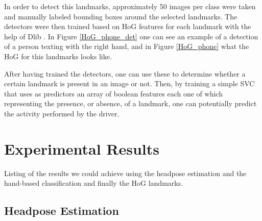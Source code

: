 \documentclass[10pt,twocolumn,letterpaper]{article}
\begin{document}
In order to detect this landmarks, approximately 50 images per class were taken and manually labeled bounding boxes around the selected landmarks. The detectors were then trained based on HoG features for each landmark with the help of Dlib \cite{dlib09}. In Figure \ref{HoG_phone_det} one can see an example of a detection of a person texting with the right hand, and in Figure \ref{HoG_phone} what the HoG for this landmarks looks like.

After having trained the detectors, one can use these to determine whether a certain landmark is present in an image or not. Then, by training a simple SVC that uses as predictors an array of boolean features each one of which representing the presence, or absence, of a landmark, one can potentially predict the activity performed by the driver.



 










\section{Experimental Results}
Listing of the results we could achieve using the headpose estimation and the hand-based classification and finally the HoG landmarks.
\subsection{Headpose Estimation}
\end{document}
